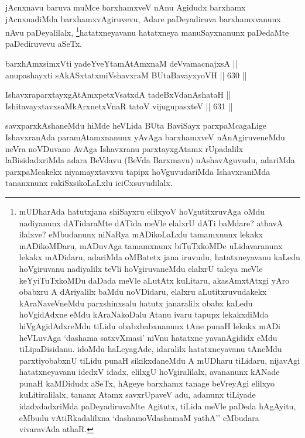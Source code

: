 \begin{artha}
jAcnxnavu baruva muMce barxhamxveV nAnu Agidudx barxhamx jAcnxnadiMda
barxhamxvAgiruvevu, Adare paDeyadiruva barxhamxvanunx nAvu
paDeyalilalx, \footnote{mUDharAda hatutxjana shiSayxru elilxyoV
hoVgutitxruvAga oMdu nadiyanunx dATidaraMte dATida meVle elalxrU
dATi baMdare? athavA ilalxve? eMbudanunx niNaRya mADikoLaLxlu
tamamxnunx lekakx mADikoMDaru, mADuvAga tamamxnunx biTuTxkoMDe
uLidavaranunx lekakx mADidaru, adariMda oMBatetx jana iruvudu,
hatatxneyavanu kaLedu hoVgiruvanu nadiyalilx teVli hoVgiruvaneMdu
elalxrU taleya meVle keYyiTuTxkoMDu daDada meVle aLutAtx kuLitaru,
akasAmxtAtxgi yAro obabxru A dAriyalilx baMdu noVDidaru, elalxru
aLutitxruvudakekx kAraNaveVneMdu parxshinxsalu hatutx janaralilx
obabx kaLedu hoVgidAdxne eMdu kAraNakoDalu Atanu ivaru tapupx
lekakxdiMda hiVgAgidAdxreMdu tiLidu obabxbabxnanunx tAne punaH
lekakx mADi heVLuvAga `dashama satxvXmasi' niVnu hatatxne
yavanAgididx eMdu tiLipaDisidanu. idoMdu haLeyagAde, idaralilx
hatatxneyavanu tAneMdu parxtiyobabxnU tiLidu punaH sikikxdaneMdu A
mUDharu tiLidaru, nijavAgi hatatxneyavanu idedxV idadx, elilxgU
hoVgiralilalx, avananunx kANade punaH kaMDidudx aSeTx, hAgeye
barxhamx tanage beVreyAgi elilxyo kuLitiralilalx, tananx Atamx
savxrUpaveV adu, adanunx tiLiyade idadxdadxriMda paDeyadiruvaMte
Agitutx, tiLida meVle paDeda hAgAyitu, eMbudu vAtiRkadalilxna
`dashamoVdashamaM yathA'' eMbudara vivaravAda athaR.}hatatxneyavanu hatatxneya manuSayxnanunx
paDedaMte paDediruvevu aSeTx.
\end{artha}

\begin{shl}
barxhAmxsimxVti yadeYveYtamAtAmxnaM deVvamacnajxsA || \\
anupashayxti sAkASxtatxmiVshavxraM BUtaBavayxyoVH \hfill || 630 ||  
\end{shl}

\begin{shl}
IshavxraparxtayxgAtAmxpetxVsatxdA tadeBxVdanAshataH || \\
IshitavayxtavxsaMkArxnetxVnaR tatoV vijugupasxteV \hfill || 631 ||  
\end{shl}

\begin{artha}
savxparxkAshaneMdu hiMde heVLida BUta BaviSayx parxpaMcagaLige
IshavxranAda paramAtamxnanunx yAvAga barxhamxveV nAnAgiruveneMdu neVra
noVDuvano AvAga Ishavxranu parxtayxgAtamx rUpadalilx laBisidadxriMda
adara BeVdavu (BeVda Barxmavu) nAshavAguvudu, adariMda parxpaMcakekx
niyamayxtavxvu tapipx hoVguvudariMda IshavxraniMda tananxnunx
rakiSxsikoLaLxlu iciCxsuvudilalx.
\end{artha}

